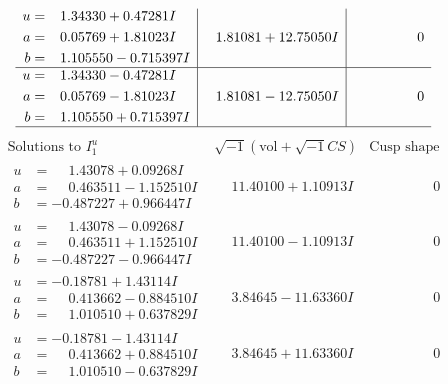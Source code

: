 \documentclass[1p]{elsarticle_modified}
\theoremstyle{definition}
\newcommand{\I}{\sqrt{-1}}
\begin{document}
$$\begin{array}{c|c|c}
\begin{aligned}
u &= \phantom{-}1.34330 + 0.47281 I \\
a &= \phantom{-}0.05769 + 1.81023 I \\
b &= \phantom{-}1.105550 - 0.715397 I\end{aligned}
 & \phantom{-}1.81081 + 12.75050 I & \phantom{-0.000000 } 0 \\ \hline\begin{aligned}
u &= \phantom{-}1.34330 - 0.47281 I \\
a &= \phantom{-}0.05769 - 1.81023 I \\
b &= \phantom{-}1.105550 + 0.715397 I\end{aligned}
 & \phantom{-}1.81081 - 12.75050 I & \phantom{-0.000000 } 0\\
 \hline 
 \end{array}$$\newpage$$\begin{array}{c|c|c}  
\text{Solutions to }I^u_{1}& \I (\text{vol} + \sqrt{-1}CS) & \text{Cusp shape}\\
 \hline 
\begin{aligned}
u &= \phantom{-}1.43078 + 0.09268 I \\
a &= \phantom{-}0.463511 - 1.152510 I \\
b &= -0.487227 + 0.966447 I\end{aligned}
 & \phantom{-}11.40100 + 1.10913 I & \phantom{-0.000000 } 0 \\ \hline\begin{aligned}
u &= \phantom{-}1.43078 - 0.09268 I \\
a &= \phantom{-}0.463511 + 1.152510 I \\
b &= -0.487227 - 0.966447 I\end{aligned}
 & \phantom{-}11.40100 - 1.10913 I & \phantom{-0.000000 } 0 \\ \hline\begin{aligned}
u &= -0.18781 + 1.43114 I \\
a &= \phantom{-}0.413662 - 0.884510 I \\
b &= \phantom{-}1.010510 + 0.637829 I\end{aligned}
 & \phantom{-}3.84645 - 11.63360 I & \phantom{-0.000000 } 0 \\ \hline\begin{aligned}
u &= -0.18781 - 1.43114 I \\
a &= \phantom{-}0.413662 + 0.884510 I \\
b &= \phantom{-}1.010510 - 0.637829 I\end{aligned}
 & \phantom{-}3.84645 + 11.63360 I & \phantom{-0.000000 } 0 \\ \hline\begin{aligned}

\end{aligned}
\end{array}$$
\end{document}

